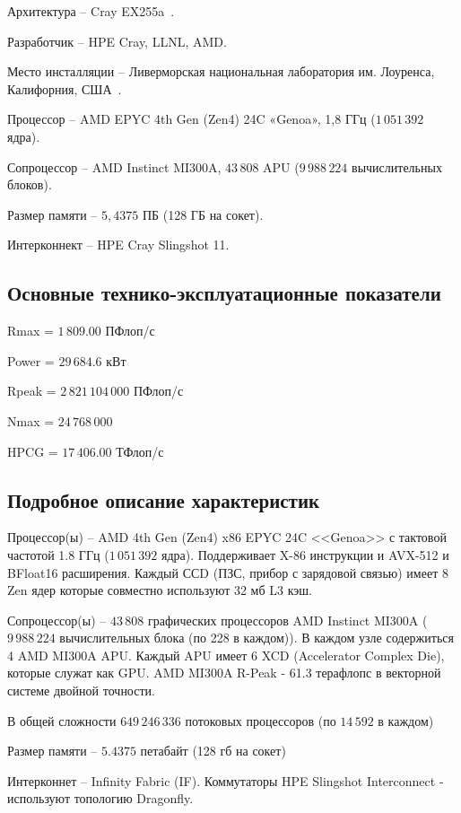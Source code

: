\documentclass[14pt,a4paper]{extarticle}
\begin{document}
    Архитектура -- Cray EX255a~\cite{top500}.

    Разработчик -- HPE Cray, LLNL, AMD.

    Место инсталляции -- Ливерморская национальная лаборатория им. Лоуренса, Калифорния, США~\cite{wikiped}.

    Процессор -- AMD EPYC 4th Gen (Zen4) 24C «Genoa», 1{,}8 ГГц ($1\,051\,392$ ядра).

    Сопроцессор -- AMD Instinct MI300A, $43\,808$ APU ($9\,988\,224$ вычислительных блоков).

    Размер памяти -- $5{,}4375$ ПБ (128 ГБ на сокет).

    Интерконнект -- HPE Cray Slingshot 11.

\subsection{Основные технико-эксплуатационные показатели}

    Rmax = $1\,809.00$ ПФлоп/с

    Power = $29\,684.6$ кВт

    Rpeak = $2\,821\,104\,000$ ПФлоп/с

    Nmax = $24\,768\,000$

    HPCG = $17\,406.00$ ТФлоп/с

\subsection{Подробное описание характеристик}

    Процессор(ы) -- AMD 4th Gen (Zen4) x86 EPYC 24C <<Genoa>> с тактовой частотой 1.8 ГГц ($1\,051\,392$ ядра).
    Поддерживает X-86 инструкции и AVX-512 и BFloat16 расширения. Каждый ССD
    (ПЗС, прибор с зарядовой связью) имеет 8 Zen ядер которые совместно
    используют 32 мб L3 кэш.

    Сопроцессор(ы) -- $43\,808$ графических процессоров AMD Instinct MI300A
    ($9\,988\,224$ вычислительных блока (по 228 в каждом)). В каждом узле содержиться 4 AMD MI300A APU.
    Каждый APU имеет 6 XCD (Accelerator Complex Die), которые служат как GPU.
    AMD MI300A R-Peak - 61.3 терафлопс в векторной системе двойной точности.

    В общей сложности $649\,246\,336$ потоковых процессоров (по $14\,592$ в каждом)

    Размер памяти -- $5.4375$ петабайт (128 гб на сокет)

    Интерконнет -- Infinity Fabric (IF). Коммутаторы HPE Slingshot Interconnect - используют топологию Dragonfly.
\end{document}
